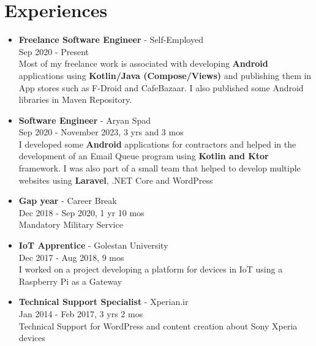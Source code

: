 \section*{\LARGE{Experiences}}
\begin{itemize}
    \item \large{\textbf{Freelance Software Engineer} - Self-Employed\\}
    \normalsize{Sep 2020 - Present\\
    Most of my freelance work is associated with developing \textbf{Android} applications using
    \textbf{Kotlin/Java (Compose/Views)} and publishing them in App stores such as F-Droid and CafeBazaar.
    I also published some Android libraries in Maven Repository.}
    \item \large{\textbf{Software Engineer} - Aryan Spad\\}
    \normalsize{Sep 2020 - November 2023, 3 yrs and 3 mos\\I developed some \textbf{Android} applications for contractors
    and helped in the development of an Email Queue program using \textbf{Kotlin and Ktor} framework.
    I was also part of a small team that helped to develop multiple websites using \textbf{Laravel}, .NET Core and WordPress}
    \item \large{\textbf{Gap year} - Career Break\\}\normalsize{Dec 2018 - Sep 2020, 1 yr 10 mos\\ Mandatory Military Service}
    \item \large{\textbf{IoT Apprentice} - Golestan University\\}
    \normalsize{Dec 2017 - Aug 2018, 9 mos\\I worked on a project developing a platform for devices in IoT using a Raspberry Pi as a Gateway}
    \item \large{\textbf{Technical Support Specialist} - Xperian.ir\\}
    \normalsize{Jan 2014 - Feb 2017, 3 yrs 2 mos\\Technical Support for WordPress and content creation about Sony Xperia devices}
\end{itemize}